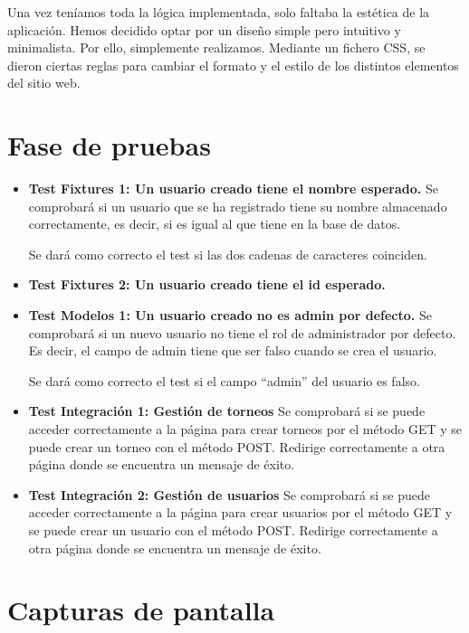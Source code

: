 \documentclass{article}
\begin{document}
Una vez teníamos toda la lógica implementada, solo faltaba la estética de la aplicación. Hemos decidido optar por un diseño simple pero intuitivo y minimalista. Por ello,
simplemente realizamos. Mediante un fichero CSS, se dieron ciertas reglas para cambiar el formato y el estilo de los distintos elementos del sitio web.

\section{Fase de pruebas}
\begin{itemize}
  \item \textbf{Test Fixtures 1: Un usuario creado tiene el nombre esperado.}
  Se comprobará si un usuario que se ha registrado tiene su nombre almacenado correctamente, es decir,
  si es igual al que tiene en la base de datos.

  Se dará como correcto el test si las dos cadenas de caracteres coinciden.

  \item \textbf{Test Fixtures 2: Un usuario creado tiene el id esperado.}
  
  \item \textbf{Test Modelos 1: Un usuario creado no es admin por defecto.}
  Se comprobará si un nuevo usuario no tiene el rol de administrador por defecto. Es decir,
  el campo de admin tiene que ser falso cuando se crea el usuario.

  Se dará como correcto el test si el campo ``admin'' del usuario es falso. 

  \item \textbf{Test Integración 1: Gestión de torneos} Se comprobará si se puede acceder correctamente a la página para crear torneos por el método GET y
   se puede crear un torneo con el método POST. Redirige correctamente a otra página donde se encuentra un mensaje de éxito.
   \item \textbf{Test Integración 2: Gestión de usuarios} Se comprobará si se puede acceder correctamente a la página para crear usuarios por el método GET y
   se puede crear un usuario con el método POST. Redirige correctamente a otra página donde se encuentra un mensaje de éxito.

\end{itemize}

\section{Capturas de pantalla}
\end{document}
